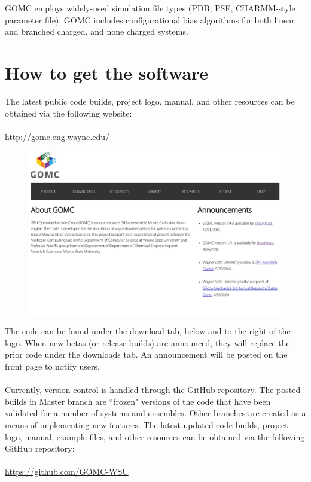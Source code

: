 GOMC employs widely-used simulation file types (PDB, PSF, CHARMM-style parameter file).  GOMC includes configurational bias algorithms for both linear and branched charged, and none charged systems. 

\newpage
\section{How to get the software}
The latest public code builds, project logo, manual, and other resources can be obtained via the following website:\\\\
\url{http://gomc.eng.wayne.edu/}

\begin{figure}[H]
\centering
\includegraphics[scale=0.15]{images/website}
\end{figure}

The code can be found under the download tab, below and to the right of the logo.  When new betas (or release builds) are announced, they will replace the prior code under the downloads tab.  An announcement will be posted on the front page to notify users. \\\\
Currently, version control is handled through the GitHub repository.  The posted builds in Master branch are ``frozen" versions of the code that have been validated for a number of systems and ensembles. Other branches are created as a means of implementing new features. The latest updated code builds, project logo, manual, example files, and other resources can be obtained via the following GitHub repository:\\\\
\url{https://github.com/GOMC-WSU}

